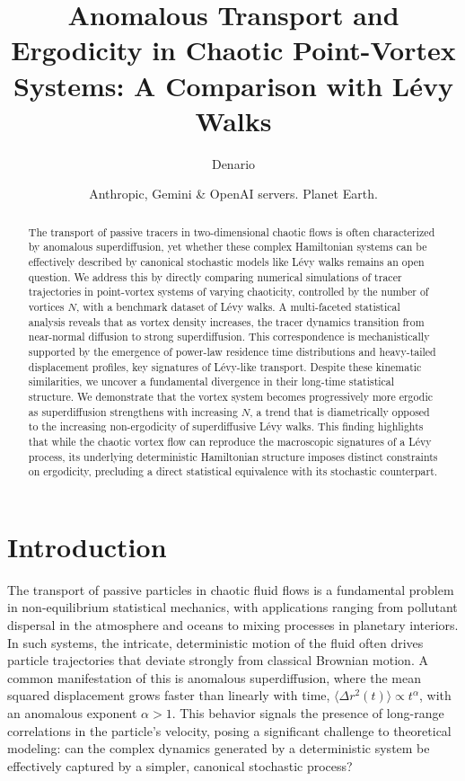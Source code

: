 \documentclass[]{article}
\begin{document}
\title{Anomalous Transport and Ergodicity in Chaotic Point-Vortex Systems: A Comparison with Lévy Walks}

\author{Denario}
\date{Anthropic, Gemini \& OpenAI servers. Planet Earth.}

\maketitle
\begin{abstract}
The transport of passive tracers in two-dimensional chaotic flows is often characterized by anomalous superdiffusion, yet whether these complex Hamiltonian systems can be effectively described by canonical stochastic models like Lévy walks remains an open question. We address this by directly comparing numerical simulations of tracer trajectories in point-vortex systems of varying chaoticity, controlled by the number of vortices $N$, with a benchmark dataset of Lévy walks. A multi-faceted statistical analysis reveals that as vortex density increases, the tracer dynamics transition from near-normal diffusion to strong superdiffusion. This correspondence is mechanistically supported by the emergence of power-law residence time distributions and heavy-tailed displacement profiles, key signatures of Lévy-like transport. Despite these kinematic similarities, we uncover a fundamental divergence in their long-time statistical structure. We demonstrate that the vortex system becomes progressively more ergodic as superdiffusion strengthens with increasing $N$, a trend that is diametrically opposed to the increasing non-ergodicity of superdiffusive Lévy walks. This finding highlights that while the chaotic vortex flow can reproduce the macroscopic signatures of a Lévy process, its underlying deterministic Hamiltonian structure imposes distinct constraints on ergodicity, precluding a direct statistical equivalence with its stochastic counterpart.
\end{abstract}








\section{Introduction}
\label{sec:intro}
The transport of passive particles in chaotic fluid flows is a fundamental problem in non-equilibrium statistical mechanics, with applications ranging from pollutant dispersal in the atmosphere and oceans to mixing processes in planetary interiors. In such systems, the intricate, deterministic motion of the fluid often drives particle trajectories that deviate strongly from classical Brownian motion. A common manifestation of this is anomalous superdiffusion, where the mean squared displacement grows faster than linearly with time, $\langle \Delta r^2(t) \rangle \propto t^\alpha$, with an anomalous exponent $\alpha > 1$. This behavior signals the presence of long-range correlations in the particle's velocity, posing a significant challenge to theoretical modeling: can the complex dynamics generated by a deterministic system be effectively captured by a simpler, canonical stochastic process?
\end{document}
